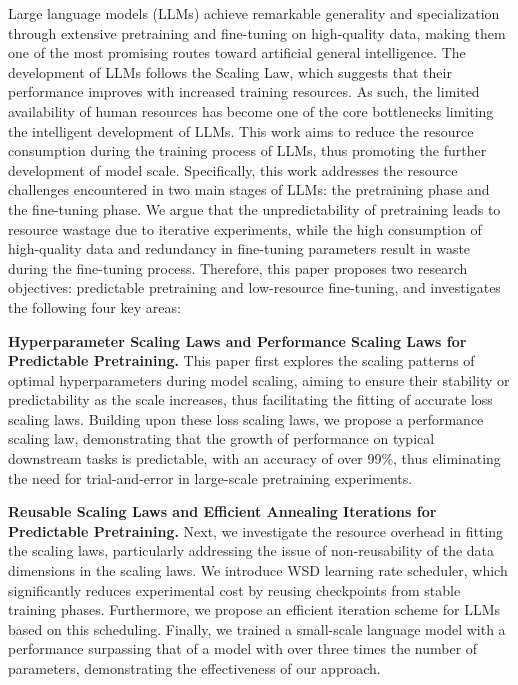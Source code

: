 \begin{abstract*}  
Large language models (LLMs) achieve remarkable generality and specialization through extensive pretraining and fine-tuning on high-quality data, making them one of the most promising routes toward artificial general intelligence. The development of LLMs follows the Scaling Law, which suggests that their performance improves with increased training resources. As such, the limited availability of human resources has become one of the core bottlenecks limiting the intelligent development of LLMs. This work aims to reduce the resource consumption during the training process of LLMs, thus promoting the further development of model scale. Specifically, this work addresses the resource challenges encountered in two main stages of LLMs: the pretraining phase and the fine-tuning phase. We argue that the unpredictability of pretraining leads to resource wastage due to iterative experiments, while the high consumption of high-quality data and redundancy in fine-tuning parameters result in waste during the fine-tuning process. Therefore, this paper proposes two research objectives: predictable pretraining and low-resource fine-tuning, and investigates the following four key areas:

\textbf{Hyperparameter Scaling Laws and Performance Scaling Laws for Predictable Pretraining.} This paper first explores the scaling patterns of optimal hyperparameters during model scaling, aiming to ensure their stability or predictability as the scale increases, thus facilitating the fitting of accurate loss scaling laws. Building upon these loss scaling laws, we propose a performance scaling law, demonstrating that the growth of performance on typical downstream tasks is predictable, with an accuracy of over 99\%, thus eliminating the need for trial-and-error in large-scale pretraining experiments.
  
\textbf{Reusable Scaling Laws and Efficient Annealing Iterations for Predictable Pretraining.} Next, we investigate the resource overhead in fitting the scaling laws, particularly addressing the issue of non-reusability of the data dimensions in the scaling laws. We introduce WSD learning rate scheduler, which significantly reduces experimental cost by reusing checkpoints from stable training phases. Furthermore, we propose an efficient iteration scheme for LLMs based on this scheduling. Finally, we trained a small-scale language model with a performance surpassing that of a model with over three times the number of parameters, demonstrating the effectiveness of our approach.
  

\end{abstract*}
